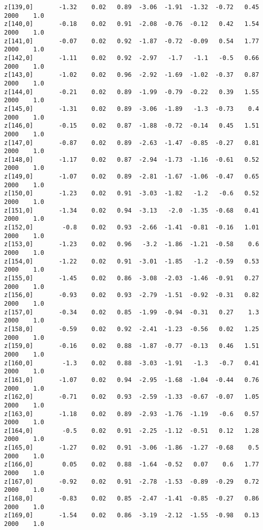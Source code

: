 \documentclass[11pt]{article}
\begin{document}
\begin{Verbatim}[commandchars=\\\{\}]
z[139,0]       -1.32    0.02   0.89  -3.06  -1.91  -1.32  -0.72   0.45   2000    1.0
z[140,0]       -0.18    0.02   0.91  -2.08  -0.76  -0.12   0.42   1.54   2000    1.0
z[141,0]       -0.07    0.02   0.92  -1.87  -0.72  -0.09   0.54   1.77   2000    1.0
z[142,0]       -1.11    0.02   0.92  -2.97   -1.7   -1.1   -0.5   0.66   2000    1.0
z[143,0]       -1.02    0.02   0.96  -2.92  -1.69  -1.02  -0.37   0.87   2000    1.0
z[144,0]       -0.21    0.02   0.89  -1.99  -0.79  -0.22   0.39   1.55   2000    1.0
z[145,0]       -1.31    0.02   0.89  -3.06  -1.89   -1.3  -0.73    0.4   2000    1.0
z[146,0]       -0.15    0.02   0.87  -1.88  -0.72  -0.14   0.45   1.51   2000    1.0
z[147,0]       -0.87    0.02   0.89  -2.63  -1.47  -0.85  -0.27   0.81   2000    1.0
z[148,0]       -1.17    0.02   0.87  -2.94  -1.73  -1.16  -0.61   0.52   2000    1.0
z[149,0]       -1.07    0.02   0.89  -2.81  -1.67  -1.06  -0.47   0.65   2000    1.0
z[150,0]       -1.23    0.02   0.91  -3.03  -1.82   -1.2   -0.6   0.52   2000    1.0
z[151,0]       -1.34    0.02   0.94  -3.13   -2.0  -1.35  -0.68   0.41   2000    1.0
z[152,0]        -0.8    0.02   0.93  -2.66  -1.41  -0.81  -0.16   1.01   2000    1.0
z[153,0]       -1.23    0.02   0.96   -3.2  -1.86  -1.21  -0.58    0.6   2000    1.0
z[154,0]       -1.22    0.02   0.91  -3.01  -1.85   -1.2  -0.59   0.53   2000    1.0
z[155,0]       -1.45    0.02   0.86  -3.08  -2.03  -1.46  -0.91   0.27   2000    1.0
z[156,0]       -0.93    0.02   0.93  -2.79  -1.51  -0.92  -0.31   0.82   2000    1.0
z[157,0]       -0.34    0.02   0.85  -1.99  -0.94  -0.31   0.27    1.3   2000    1.0
z[158,0]       -0.59    0.02   0.92  -2.41  -1.23  -0.56   0.02   1.25   2000    1.0
z[159,0]       -0.16    0.02   0.88  -1.87  -0.77  -0.13   0.46   1.51   2000    1.0
z[160,0]        -1.3    0.02   0.88  -3.03  -1.91   -1.3   -0.7   0.41   2000    1.0
z[161,0]       -1.07    0.02   0.94  -2.95  -1.68  -1.04  -0.44   0.76   2000    1.0
z[162,0]       -0.71    0.02   0.93  -2.59  -1.33  -0.67  -0.07   1.05   2000    1.0
z[163,0]       -1.18    0.02   0.89  -2.93  -1.76  -1.19   -0.6   0.57   2000    1.0
z[164,0]        -0.5    0.02   0.91  -2.25  -1.12  -0.51   0.12   1.28   2000    1.0
z[165,0]       -1.27    0.02   0.91  -3.06  -1.86  -1.27  -0.68    0.5   2000    1.0
z[166,0]        0.05    0.02   0.88  -1.64  -0.52   0.07    0.6   1.77   2000    1.0
z[167,0]       -0.92    0.02   0.91  -2.78  -1.53  -0.89  -0.29   0.72   2000    1.0
z[168,0]       -0.83    0.02   0.85  -2.47  -1.41  -0.85  -0.27   0.86   2000    1.0
z[169,0]       -1.54    0.02   0.86  -3.19  -2.12  -1.55  -0.98   0.13   2000    1.0

\end{Verbatim}
\end{document}
